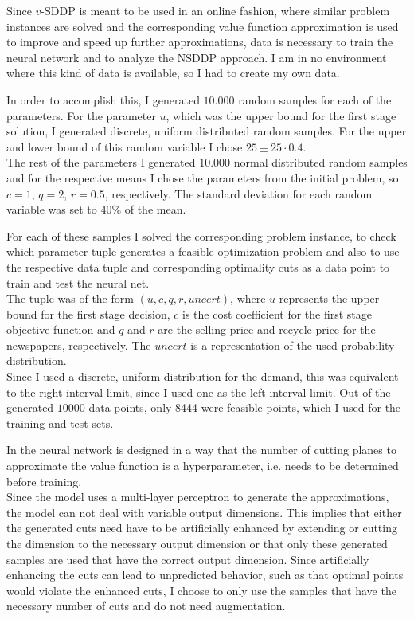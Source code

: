 Since $v$-SDDP is meant to be used in an online fashion, where similar problem instances are solved and the corresponding value function approximation is used to improve and speed up further approximations, data is necessary to train the neural network and to analyze the NSDDP approach.
I am in no environment where this kind of data is available, so I had to create my own data.

In order to accomplish this, I generated $10.000$ random samples for each of the parameters.
For the parameter $u$, which was the upper bound for the first stage solution, I generated discrete, uniform distributed random samples.
For the upper and lower bound of this random variable I chose $25 \pm 25\cdot 0.4$. \\
The rest of the parameters I generated $10.000$ normal distributed random samples and for the respective means I chose the parameters from the initial problem, so $c=1$, $q=2$, $r=0.5$, respectively.
The standard deviation for each random variable was set to $40\%$ of the mean.

For each of these samples I solved the corresponding problem instance, to check which parameter tuple generates a feasible optimization problem and also to use the respective data tuple and corresponding optimality cuts as a data point to train and test the neural net. \\
The tuple was of the form $(u, c, q, r, uncert)$, where $u$ represents the upper bound for the first stage decision, $c$ is the cost coefficient for the first stage objective function and $q$ and $r$ are the selling price and recycle price for the newspapers, respectively.
The $uncert$ is a representation of the used probability distribution. \\
Since I used a discrete, uniform distribution for the demand, this was equivalent to the right interval limit, since I used one as the left interval limit.
Out of the generated $10000$ data points, only 8444 were feasible points, which I used for the training and test sets.

In \cite{NSDDP} the neural network is designed in a way that the number of cutting planes to approximate the value function is a hyperparameter, i.e. needs to be determined before training. \\
Since the model uses a multi-layer perceptron to generate the approximations, the model can not deal with variable output dimensions.
This implies that either the generated cuts need have to be artificially enhanced by extending or cutting the dimension to the necessary output dimension or that only these generated samples are used that have the correct output dimension.
Since artificially enhancing the cuts can lead to unpredicted behavior, such as that optimal points would violate the enhanced cuts, I choose to only use the samples that have the necessary number of cuts and do not need augmentation.

